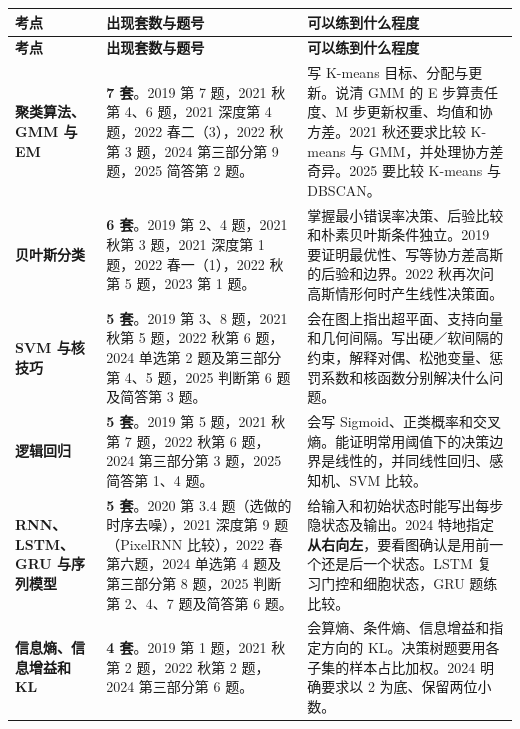 \documentclass[UTF8,a4paper,zihao=-4,fontset=fandol]{ctexart}
\begin{document}
\begingroup
\small
\renewcommand{\arraystretch}{1.17}
\begin{longtable}{L{.19}L{.385}L{.425}}
\toprule
{}
\textbf{考点} & \textbf{出现套数与题号} & \textbf{可以练到什么程度} \\
\midrule
\endfirsthead
\toprule
{}
\textbf{考点} & \textbf{出现套数与题号} & \textbf{可以练到什么程度} \\
\midrule
\endhead
\midrule
\endfoot
\bottomrule
\endlastfoot
\textbf{聚类算法、GMM 与 EM} & \textbf{7 套}。2019 第 7 题，2021 秋第 4、6 题，2021 深度第 4 题，2022 春二（3），2022 秋第 3 题，2024 第三部分第 9 题，2025 简答第 2 题。 & 写 K-means 目标、分配与更新。说清 GMM 的 E 步算责任度、M 步更新权重、均值和协方差。2021 秋还要求比较 K-means 与 GMM，并处理协方差奇异。2025 要比较 K-means 与 DBSCAN。 \\
\addlinespace[.16em]
\textbf{贝叶斯分类} & \textbf{6 套}。2019 第 2、4 题，2021 秋第 3 题，2021 深度第 1 题，2022 春一（1），2022 秋第 5 题，2023 第 1 题。 & 掌握最小错误率决策、后验比较和朴素贝叶斯条件独立。2019 要证明最优性、写等协方差高斯的后验和边界。2022 秋再次问高斯情形何时产生线性决策面。 \\
\addlinespace[.16em]
\textbf{SVM 与核技巧} & \textbf{5 套}。2019 第 3、8 题，2021 秋第 5 题，2022 秋第 6 题，2024 单选第 2 题及第三部分第 4、5 题，2025 判断第 6 题及简答第 3 题。 & 会在图上指出超平面、支持向量和几何间隔。写出硬／软间隔的约束，解释对偶、松弛变量、惩罚系数和核函数分别解决什么问题。 \\
\addlinespace[.16em]
\textbf{逻辑回归} & \textbf{5 套}。2019 第 5 题，2021 秋第 7 题，2022 秋第 6 题，2024 第三部分第 3 题，2025 简答第 1、4 题。 & 会写 Sigmoid、正类概率和交叉熵。能证明常用阈值下的决策边界是线性的，并同线性回归、感知机、SVM 比较。 \\
\addlinespace[.16em]
\textbf{RNN、LSTM、GRU 与序列模型} & \textbf{5 套}。2020 第 3.4 题（选做的时序去噪），2021 深度第 9 题（PixelRNN 比较），2022 春第六题，2024 单选第 4 题及第三部分第 8 题，2025 判断第 2、4、7 题及简答第 6 题。 & 给输入和初始状态时能写出每步隐状态及输出。2024 特地指定\textbf{从右向左}，要看图确认是用前一个还是后一个状态。LSTM 复习门控和细胞状态，GRU 题练比较。 \\
\addlinespace[.16em]
\textbf{信息熵、信息增益和 KL} & \textbf{4 套}。2019 第 1 题，2021 秋第 2 题，2022 秋第 2 题，2024 第三部分第 6 题。 & 会算熵、条件熵、信息增益和指定方向的 KL。决策树题要用各子集的样本占比加权。2024 明确要求以 2 为底、保留两位小数。 \\

\end{longtable}
\end{document}
